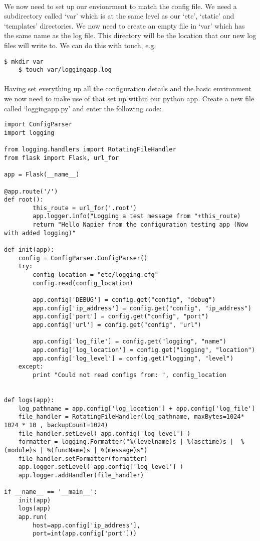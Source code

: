 \documentclass[12pt, a4paper, twoside]{book}
\begin{document}
\paragraph{} We now need to set up our envionrment to match the config file. We need a subdirectory called `var' which is at the same level as our `etc', `static' and `templates' directories. We now need to create an empty file in `var' which has the same name as the log file. This directory will be the location that our new log files will write to. We can do this with touch, e.g.

\begin{lstlisting}[style=DOS]
    $ mkdir var
    $ touch var/loggingapp.log
\end{lstlisting}

\paragraph{} Having set everything up all the configuration details and the basic environment we now need to make use of that set up within our python app. Create a new file called `loggingapp.py' and enter the following code:
\begin{lstlisting}
import ConfigParser
import logging

from logging.handlers import RotatingFileHandler
from flask import Flask, url_for

app = Flask(__name__)

@app.route('/')
def root():
        this_route = url_for('.root')
        app.logger.info("Logging a test message from "+this_route)
        return "Hello Napier from the configuration testing app (Now with added logging)" 

def init(app):
    config = ConfigParser.ConfigParser()
    try:
        config_location = "etc/logging.cfg"
        config.read(config_location)
        
        app.config['DEBUG'] = config.get("config", "debug")
        app.config['ip_address'] = config.get("config", "ip_address")
        app.config['port'] = config.get("config", "port")
        app.config['url'] = config.get("config", "url")

        app.config['log_file'] = config.get("logging", "name")
        app.config['log_location'] = config.get("logging", "location")
        app.config['log_level'] = config.get("logging", "level")
    except:
        print "Could not read configs from: ", config_location


def logs(app):
    log_pathname = app.config['log_location'] + app.config['log_file']
    file_handler = RotatingFileHandler(log_pathname, maxBytes=1024* 1024 * 10 , backupCount=1024)
    file_handler.setLevel( app.config['log_level'] )
    formatter = logging.Formatter("%(levelname)s | %(asctime)s |  %(module)s | %(funcName)s | %(message)s")
    file_handler.setFormatter(formatter)
    app.logger.setLevel( app.config['log_level'] )
    app.logger.addHandler(file_handler)

if __name__ == '__main__':
    init(app)
    logs(app)
    app.run(
        host=app.config['ip_address'], 
        port=int(app.config['port']))
\end{lstlisting}
\end{document}
